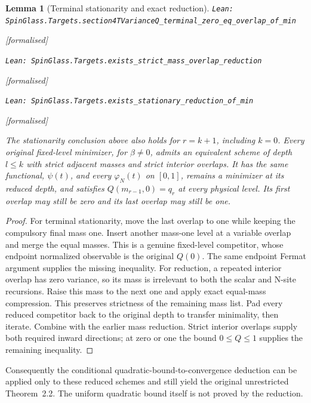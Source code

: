 \documentclass[11pt]{article}
\providecommand{\lean}[1]{\leavevmode\par\nopagebreak
  {\noindent\normalfont\footnotesize\raggedright\texttt{Lean: #1}\par}\nopagebreak}
\providecommand{\leanok}{\par\nopagebreak
  {\noindent\normalfont\footnotesize\textcolor{green!50!black}{[formalised]}\par}\nopagebreak}
\newtheorem{lemma}[theorem]{Lemma}
\begin{document}
\begin{lemma}[Terminal stationarity and exact reduction]
\lean{SpinGlass.Targets.section4TVarianceQ\_terminal\_zero\_eq\_overlap\_of\_min}\leanok
\lean{SpinGlass.Targets.exists\_strict\_mass\_overlap\_reduction}\leanok
\lean{SpinGlass.Targets.exists\_stationary\_reduction\_of\_min}\leanok
The stationarity conclusion above also holds for $r=k+1$, including $k=0$.
Every original fixed-level minimizer, for $\beta\ne0$, admits an equivalent
scheme of depth $l\le k$ with strict adjacent masses and strict interior
overlaps. It has the same functional, $\psi(t)$, and every $\varphi_N(t)$
on $[0,1]$, remains a minimizer at its reduced depth, and satisfies
$Q(m_{r-1},0)=q_r$ at every physical level. Its first overlap may still be
zero and its last overlap may still be one.
\end{lemma}
\begin{proof}
For terminal stationarity, move the last overlap to one while keeping the
compulsory final mass one. Insert another mass-one level at a variable overlap
and merge the equal masses. This is a genuine fixed-level competitor, whose
endpoint normalized observable is the original $Q(0)$. The same endpoint
Fermat argument supplies the missing inequality.
For reduction, a repeated interior overlap has zero variance, so its mass is
irrelevant to both the scalar and N-site recursions. Raise this mass to the
next one and apply exact equal-mass compression. This preserves strictness
of the remaining mass list. Pad every reduced competitor back to the original
depth to transfer minimality, then iterate. Combine with the earlier mass
reduction. Strict interior overlaps supply both required inward directions;
at zero or one the bound $0\le Q\le1$ supplies the remaining inequality.
\end{proof}
Consequently the conditional quadratic-bound-to-convergence deduction can be
applied only to these reduced schemes and still yield the original unrestricted
Theorem~2.2. The uniform quadratic bound itself is not proved by the reduction.
\end{document}
